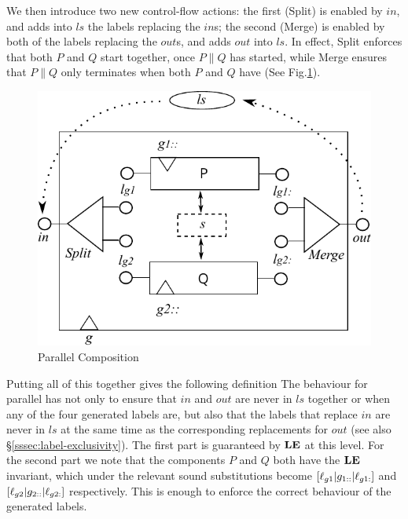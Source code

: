 We then introduce two new control-flow actions:
the first (Split) is enabled by $in$, and adds into $ls$
the labels replacing the $in$s;
the second (Merge) is enabled by both of the labels replacing the $out$s,
and adds $out$ into $ls$.
In effect, Split enforces that both $P$ and $Q$ start together,
once $P \parallel Q$ has started,
while Merge ensures that $P \parallel Q$ only terminates
when both $P$ and $Q$ have (See Fig.\ref{fig:par-comp}).
\begin{figure}
  \centering
  \includegraphics{images/par-comp-actual}
  \caption{Parallel Composition}
  \label{fig:par-comp}
\end{figure}

Putting all of this together gives the following definition
The behaviour for parallel has not only to ensure
that $in$ and $out$ are never in $ls$ together
or when any of the four generated labels are,
but also that the labels that replace $in$
are never in $ls$ at the same time as the corresponding
replacements for $out$ (see also \S\ref{sssec:label-exclusivity}).
The first part is guaranteed by $\mathbf{LE}$ at this level.
For the second part we note that  the components $P$ and $Q$
both have the $\mathbf{LE}$ invariant, which under the relevant sound substitutions
become $[\ell_{g1}|g_{1::}|\ell_{g1:}]$
and $[\ell_{g2}|g_{2::}|\ell_{g2:}]$ respectively.
This is enough to enforce the correct behaviour of the generated labels.


